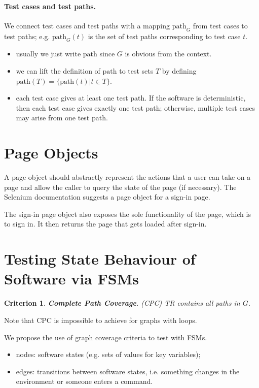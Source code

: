 \documentclass[11pt]{article}
\newtheorem{crit}{Criterion}
\begin{document}
\paragraph{Test cases and test paths.} We connect test cases and
test paths with a mapping $\mbox{path}_G$ from test cases to test
paths; e.g. $\mbox{path}_G(t)$ is the set of test paths corresponding
to test case $t$.
\begin{itemize}[noitemsep]
\item usually we just write $\mbox{path}$ since $G$ is obvious from the context.
\item we can lift the definition of $\mbox{path}$ to test sets $T$ by defining
$\mbox{path}(T) = \{ \mbox{path}(t) | t \in T \}$.
\item each test case gives at least one test path. If the software is
  deterministic, then each test case gives exactly one test path;
  otherwise, multiple test cases may arise from one test path.
\end{itemize}

\section*{Page Objects}

A page object should abstractly represent the actions that
a user can take on a page and allow the caller to query
the state of the page (if necessary). The Selenium documentation
suggests a page object for a sign-in page.

The sign-in page object also exposes the sole functionality of the
page, which is to sign in. It then returns the page that gets loaded
after sign-in.

\newpage

\section*{Testing State Behaviour of Software via FSMs}

\begin{crit}
{\bf Complete Path Coverage}. (CPC) \emph{TR} contains all paths in $G$.
\end{crit}

Note that CPC is impossible to achieve for graphs with loops.

We propose the use of graph coverage criteria to test with FSMs.
\begin{itemize}[noitemsep]
\item nodes: software states (e.g. sets of values for key variables);
\item edges: transitions between software states, i.e. something changes
in the environment or someone enters a command.
\end{itemize}
\end{document}
